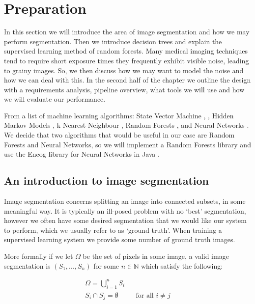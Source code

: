\documentclass[12pt,twoside,notitlepage]{report}
\newcommand{\bb}[1]{\mathbb{#1}}
\begin{document}

\cleardoublepage
\chapter{Preparation}
    In this section we will introduce the area of image segmentation and how we may perform segmentation. Then we 
    introduce decision trees and explain the supervised learning method of random forests. Many medical imaging 
    techniques tend to require short exposure times they frequently exhibit visible noise, leading to grainy images. So, 
    we then discuss how we may want to model the noise and how we can deal with this. In the second half of the chapter 
    we outline the design with a requirements analysis, pipeline overview, what tools we will use and how we will 
    evaluate our performance.

    From a list of machine learning algorithms: State Vector Machine \cite{klein2004lagrange}, \cite{law2006simple}, 
    Hidden Markov Models \cite{seymore1999learning}, k Nearest Neighbour \cite{cunningham2007k}, Random Forests 
    \cite{criminisi2013decision}, and Neural Networks \cite{heaton2008introduction}. We decide that two algorithms that 
    would be useful in our case are Random Forests and Neural Networks, so we will implement a Random Forests library 
    and use the Encog library for Neural Networks in Java \cite{JMLR:v16:heaton15a}.



    \section{An introduction to image segmentation}
        Image segmentation concerns splitting an image into connected subsets, in some meaningful way. It is typically an 
        ill-posed problem with no `best' segmentation, however we often have some desired segmentation that we would 
        like our system to perform, which we usually refer to as `ground truth'. When training a supervised learning 
        system we provide some number of ground truth images. 

        More formally if we let $\Omega$ be the set of pixels in some image, a valid image segmentation is $(S_1, ..., 
        S_n)$ for some $n \in \bb{N}$ which satisfy the following:

        \begin{align}
            \Omega = \bigcup\limits_{i=1}^n S_i \\
            S_i \cap S_j = \emptyset && \text{for all } i \neq j 
        \end{align}
\end{document}
